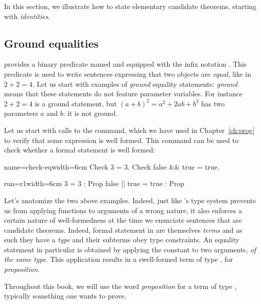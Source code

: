 In this section, we illustrate how to state elementary candidate
theorems, starting with \emph{identities}.

\subsection{Ground equalities}\label{ssec:groundeq}

\Coq{} provides a binary predicate named  and equipped with the
infix notation \C{=}. This predicate is used to write sentences
expressing that two objects are \emph{equal}, like in $2 + 2 = 4$.
Let us start with examples of \Coq{} \emph{ground} equality
statements: \emph{ground} means that these statements do not feature
parameter variables. For instance $2 + 2 = 4$ is a ground
statement, but $(a + b)^2 = a^2 + 2ab + b^2$ has two parameters $a$
and $b$: it is not ground.

Let us start with calls to the  command, which we have used
in Chapter~\ref{ch:prog} to verify that some expression is well
formed. This command can be used to check whether a formal statement
is well formed:

\begin{coq}{name=check-eq}{width=6cm}
Check 3 = 3.
Check false && true = true.
\end{coq}
\begin{coqout}{run=r1}{width=6cm}
3 = 3 : Prop
false || true = true : Prop
\end{coqout}

Let's anatomize the two above examples. Indeed, just like \Coq{}'s
type system prevents us from applying functions to
arguments of a wrong nature, it also enforces a certain nature of
well-formedness at the time we enunciate sentences that are candidate
theorems. Indeed, formal statement in \Coq{} are themselves
\emph{terms} and as such they have a \emph{type} and their subterms
obey type constraints. An
equality statement in particular is obtained by applying the constant
 to two arguments, \emph{of the same type}. This application
results in a swell-formed term of type , for \emph{proposition}.

Throughout this book, we will
use the word \emph{proposition} for a term of type , typically
something one wants to prove.

